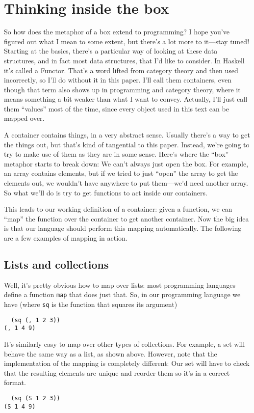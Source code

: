 \documentclass{article}
\newcommand{\code}[1]{\lstinline`#1`}
\begin{document}
\section{Thinking inside the box}
So how does the metaphor of a box extend to programming? I hope you've figured out what I mean to some extent, but there's a lot more to it---stay tuned! Starting at the basics, there's a particular way of looking at these data structures, and in fact most data structures, that I'd like to consider. In Haskell it's called a Functor. That's a word lifted from category theory and then used incorrectly, so I'll do without it in this paper. I'll call them containers, even though that term also shows up in programming and category theory, where it means something a bit weaker than what I want to convey. Actually, I'll just call them ``values'' most of the time, since every object used in this text can be mapped over.

A container contains things, in a very abstract sense. Usually there's a way to get the things out, but that's kind of tangential to this paper. Instead, we're going to try to make use of them as they are in some sense. Here's where the ``box'' metaphor starts to break down: We can't always just open the box. For example, an array contains elements, but if we tried to just ``open'' the array to get the elements out, we wouldn't have anywhere to put them---we'd need another array. So what we'll do is try to get functions to act inside our containers.

This leads to our working definition of a container: given a function, we can ``map'' the function over the container to get another container. Now the big idea is that our language should perform this mapping automatically. The following are a few examples of mapping in action.

\subsection{Lists and collections}
Well, it's pretty obvious how to map over lists: most programming languages define a function \code{map} that does just that. So, in our programming language we have (where \code{sq} is the function that
squares its argument)
\begin{lstlisting}
  (sq (, 1 2 3))
(, 1 4 9)
\end{lstlisting}
It's similarly easy to map over other types of collections. For example, a set will behave the same way as a list, as shown above. However, note that the implementation of the mapping is completely different: Our set will have to check that the resulting elements are unique and reorder them so it's in a correct format.
\begin{lstlisting}
  (sq (S 1 2 3))
(S 1 4 9)
\end{lstlisting}
\end{document}
